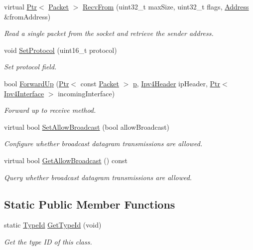 \begin{DoxyCompactItemize}
virtual \hyperlink{classns3_1_1Ptr}{Ptr}$<$ \hyperlink{classns3_1_1Packet}{Packet} $>$ \hyperlink{classns3_1_1Ipv4RawSocketImpl_a4a004b1ebdcb92d83ee083cdd5543a56}{Recv\+From} (uint32\+\_\+t max\+Size, uint32\+\_\+t flags, \hyperlink{classns3_1_1Address}{Address} \&from\+Address)
\begin{DoxyCompactList}\small\item\em Read a single packet from the socket and retrieve the sender address. \end{DoxyCompactList}\item 
void \hyperlink{classns3_1_1Ipv4RawSocketImpl_a7c5a00ba94fee5acefd972c71517062b}{Set\+Protocol} (uint16\+\_\+t protocol)
\begin{DoxyCompactList}\small\item\em Set protocol field. \end{DoxyCompactList}\item 
bool \hyperlink{classns3_1_1Ipv4RawSocketImpl_ab4fc4f9979027503156102d42ec62e9b}{Forward\+Up} (\hyperlink{classns3_1_1Ptr}{Ptr}$<$ const \hyperlink{classns3_1_1Packet}{Packet} $>$ \hyperlink{lte__link__budget__x2__handover__measures_8m_ac9de518908a968428863f829398a4e62}{p}, \hyperlink{classns3_1_1Ipv4Header}{Ipv4\+Header} ip\+Header, \hyperlink{classns3_1_1Ptr}{Ptr}$<$ \hyperlink{classns3_1_1Ipv4Interface}{Ipv4\+Interface} $>$ incoming\+Interface)
\begin{DoxyCompactList}\small\item\em Forward up to receive method. \end{DoxyCompactList}\item 
virtual bool \hyperlink{classns3_1_1Ipv4RawSocketImpl_aa7089a120a9c1b5bbb2cb19ff204b5de}{Set\+Allow\+Broadcast} (bool allow\+Broadcast)
\begin{DoxyCompactList}\small\item\em Configure whether broadcast datagram transmissions are allowed. \end{DoxyCompactList}\item 
virtual bool \hyperlink{classns3_1_1Ipv4RawSocketImpl_ac1345101c6fd1f1ba8f7c05a326faab3}{Get\+Allow\+Broadcast} () const 
\begin{DoxyCompactList}\small\item\em Query whether broadcast datagram transmissions are allowed. \end{DoxyCompactList}\end{DoxyCompactItemize}
\subsection*{Static Public Member Functions}
\begin{DoxyCompactItemize}
\item 
static \hyperlink{classns3_1_1TypeId}{Type\+Id} \hyperlink{classns3_1_1Ipv4RawSocketImpl_a3d0791fa8fd3fb01db1e860ad259e21b}{Get\+Type\+Id} (void)
\begin{DoxyCompactList}\small\item\em Get the type ID of this class. \end{DoxyCompactList}\end{DoxyCompactItemize}
